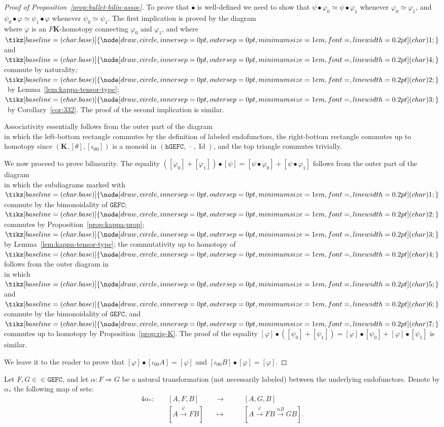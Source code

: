 \documentclass[10pt]{simplearticle}
\newcommand{\tikzinput}[1]{}
\newcommand{\tcbase}[1]{%
  \mathord{%
    \tikz[baseline=(char.base)]{
      \node[draw,circle,inner sep=0pt,outer sep=0pt,minimum size=1em,font=\small,line width=0.2pt] (char) {#1};
    }%
  }%
}
\newcommand{\Id}{\operatorname{Id}}
\newcommand{\GEFC}{\mathbb{\mathtt{GEFC}}}
\newcommand{\hGEFC}{\mathtt{hGEFC}}
\newcommand{\tc}[1]{\tcbase{#1}}
\newcommand{\fK}{\mathbf{K}}
\newcommand{\singledot}{\,\cdot\,}
\begin{document}
\begin{proof}
[Proof of Proposition~\ref{prop:bullet-bilin-assoc}]To prove that
$\bullet$ is well-defined we need to show that $\psi\bullet\varphi_{0}\simeq\psi\bullet\varphi_{1}$
whenever $\varphi_{0}\simeq\varphi_{1}$, and $\psi_{0}\bullet\varphi\simeq\psi_{1}\bullet\varphi$
whenever $\psi_{0}\simeq\psi_{1}$. The first implication is proved
by the diagram
\[
\tikzinput{d490}
\]
where $\varphi$ is an $F\fK$-homotopy connecting $\varphi_{0}$
and $\varphi_{1}$, and where $\tc 1$ and $\tc 4$ commute by naturality;
$\tc 2$~by Lemma~\ref{lem:kappa-tensor-type}; $\tc 3$~by Corollary~\ref{cor:332}.
The proof of the second implication is similar.

Associativity essentially follows from the outer part of the diagram
\[
\tikzinput{d304}
\]
in which the left-bottom rectangle commutes by the definition of labeled
endofunctors, the right-bottom rectangle commutes up to homotopy since
$(\fK,[\theta],[\iota_{00}])$ is a monoid in $(\hGEFC,\singledot,\Id)$,
and the top triangle commutes trivially.

We now proceed to prove bilinearity. The equality $([\varphi_{0}]+[\varphi_{1}])\bullet[\psi]=[\psi\bullet\varphi_{0}]+[\psi\bullet\varphi_{1}]$
follows from the outer part of the diagram
\[
\tikzinput{d400}
\]
in which the subdiagrams marked with $\tc 1$ commute by the bimonoidality
of $\GEFC$; $\tc 2$ commutes by Proposition~\ref{prop:kappa-prop};
$\tc 3$ by Lemma~\ref{lem:kappa-tensor-type}; the commutativity
up to homotopy of $\tc 4$ follows from the outer diagram in
\[
\tikzinput{d401}
\]
in which $\tc 5$ and $\tc 6$ commute by the bimonoidality of $\GEFC$,
and $\tc 7$ commutes up to homotopy by Proposition~\ref{prop:rig-K}.
The proof of the equality $[\varphi]\bullet([\psi_{0}]+[\psi_{1}])=[\varphi]\bullet[\psi_{0}]+[\varphi]\bullet[\psi_{1}]$
is similar.

We leave it to the reader to prove that $[\varphi]\bullet[\iota_{00}A]=[\varphi]$
and $[\iota_{00}B]\bullet[\varphi]=[\varphi]$.
\end{proof}

\begin{defn}
Let $F,G\in\in\GEFC$, and let $\alpha\colon F\Rightarrow G$ be a
natural transformation (not necessarily labeled) between the underlying
endofunctors. Denote by $\alpha_{*}$ the following map of sets:
\begin{alignat*}{4}
\alpha_{*}\colon &\ 
& [A,F,B] & ~ & \to & ~ &\ 
& [A,G,B]\\
 &\ 
& [A\xrightarrow{\varphi}FB] &\ 
& \mapsto &\ 
&\ 
& [A\xrightarrow{\varphi}FB\xrightarrow{\alpha B}GB].
\end{alignat*}
\end{defn}
\end{document}
